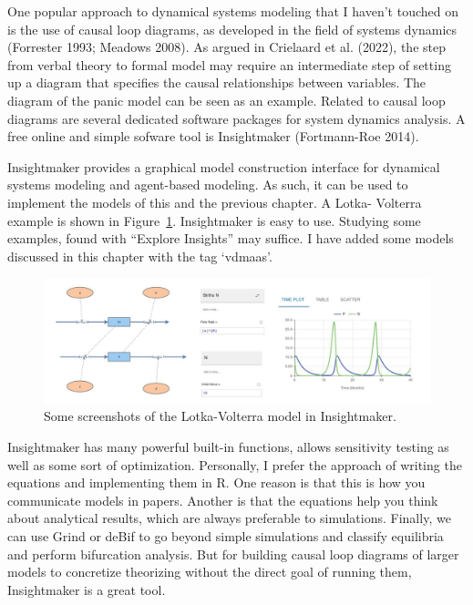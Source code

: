 \documentclass[
  a4paper,
  DIV=11,
  numbers=noendperiod,
  oneside]{scrreprt}
\begin{document}
One popular approach to dynamical systems modeling that I haven't
touched on is the use of causal loop diagrams, as developed in the field
of systems dynamics (Forrester 1993; Meadows 2008). As argued in
Crielaard et al. (2022), the step from verbal theory to formal model may
require an intermediate step of setting up a diagram that specifies the
causal relationships between variables. The diagram of the panic model
can be seen as an example. Related to causal loop diagrams are several
dedicated software packages for system dynamics analysis. A free online
and simple sofware tool is Insightmaker (Fortmann-Roe 2014).

Insightmaker provides a graphical model construction interface for
dynamical systems modeling and agent-based modeling. As such, it can be
used to implement the models of this and the previous chapter. A Lotka-
Volterra example is shown in Figure~\ref{fig-ch4n-img21-old-69}.
Insightmaker is easy to use. Studying some examples, found with
``Explore Insights'' may suffice. I have added some models discussed in
this chapter with the tag `vdmaas'.

\begin{figure}

{\centering \includegraphics{media/ch4n/image21.jpg}

}

\caption{\label{fig-ch4n-img21-old-69}Some screenshots of the
Lotka-Volterra model in Insightmaker.}

\end{figure}

Insightmaker has many powerful built-in functions, allows sensitivity
testing as well as some sort of optimization. Personally, I prefer the
approach of writing the equations and implementing them in R. One reason
is that this is how you communicate models in papers. Another is that
the equations help you think about analytical results, which are always
preferable to simulations. Finally, we can use Grind or deBif to go
beyond simple simulations and classify equilibria and perform
bifurcation analysis. But for building causal loop diagrams of larger
models to concretize theorizing without the direct goal of running them,
Insightmaker is a great tool.
\end{document}
